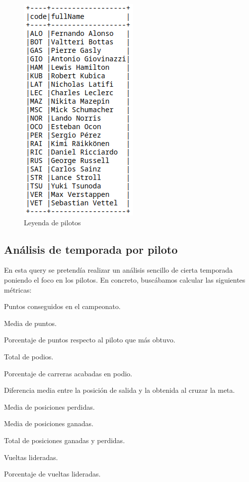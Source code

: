 \documentclass[12pt,twoside,titlepage]{report}
\begin{document}
\begin{figure}[H]
	\includegraphics[scale=0.4]{leyendapilotos.png}
	\centering
	\caption{Leyenda de pilotos}
	\label{fig:leyendapilotos}
	\centering
\end{figure}


\subsection{Análisis de temporada por piloto}

En esta query se pretendía realizar un análisis sencillo de cierta temporada poniendo el foco en los pilotos. En concreto, buscábamos calcular las siguientes métricas:

\begin{compactitem}
	\item Puntos conseguidos en el campeonato.
	\item Media de puntos.
	\item Porcentaje de puntos respecto al piloto que más obtuvo.
	\item Total de podios.
	\item Porcentaje de carreras acabadas en podio.
	\item Diferencia media entre la posición de salida y la obtenida al cruzar la meta.
	\item Media de posiciones perdidas.
	\item Media de posiciones ganadas.
	\item Total de posiciones ganadas y perdidas.
	\item Vueltas lideradas.
	\item Porcentaje de vueltas lideradas.
\end{compactitem}
\end{document}
